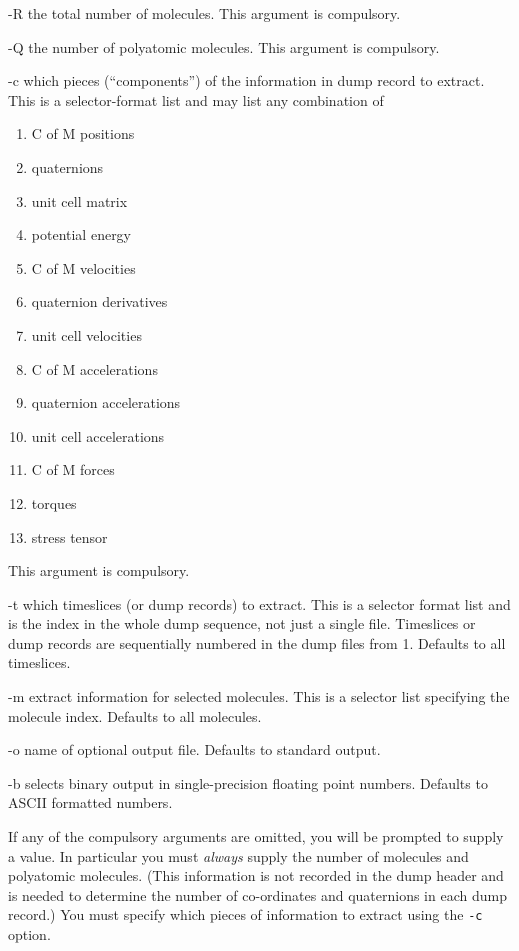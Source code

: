 \documentclass[twoside]{report}
\begin{document}
\begin{list}{}{\let\makelabel\boldlabel\itemsep=0pt\parsep=3pt\leftmargin=1.5cm}
\item[-R] the total number of molecules.  This argument is compulsory.
\item[-Q] the number of polyatomic molecules.  This argument is compulsory.
\item[-c] which pieces (``components'') of the information in dump
record to extract.  This is a selector-format list and may list any
combination of
\begin{enumerate}
\itemsep=0pt
\parskip=0pt
\item C of M positions
\item quaternions
\item unit cell matrix
\item potential energy
\item C of M velocities
\item quaternion derivatives
\item unit cell velocities
\item C of M accelerations
\item quaternion accelerations
\item unit cell accelerations
\item C of M forces
\item torques
\item stress tensor
\end{enumerate}
This argument is compulsory.
\item[-t] which timeslices (or dump records) to extract.  This is a
selector format list and is the index in the whole dump sequence, not
just a single file.  Timeslices or dump records are sequentially
numbered in the dump files from 1.  Defaults to all timeslices.
\item[-m] extract information for selected molecules.  This is a
selector list specifying the molecule index.  Defaults to all
molecules.
\item[-o] name of optional output file.  Defaults to standard output.
\item[-b] selects binary output in single-precision floating point
numbers. Defaults to ASCII formatted numbers.
\end{list}
If any of the compulsory arguments are omitted, you will be prompted
to supply a value.  In particular you must {\em always\/} supply the
number of molecules and polyatomic molecules.  (This information is
not recorded in the dump header and is needed to determine the number
of co-ordinates and quaternions in each dump record.)  You must
specify which pieces of information to extract using the \texttt{-c}
option.
\end{document}
